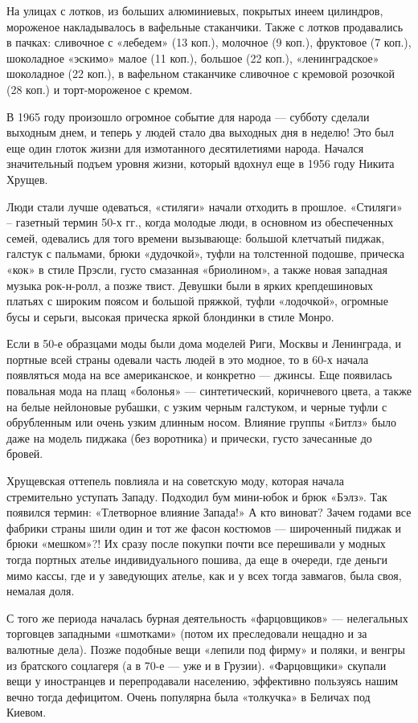 На улицах с лотков, из больших алюминиевых, покрытых инеем цилиндров, мороженое
накладывалось в вафельные стаканчики. Также с лотков продавались в пачках:
сливочное с «лебедем» (13 коп.), молочное (9 коп.), фруктовое (7 коп.),
шоколадное «эскимо» малое (11 коп.), большое (22 коп.), «ленинградское»
шоколадное (22 коп.), в вафельном стаканчике сливочное с кремовой розочкой (28
коп.) и торт-мороженое с кремом. 

В 1965 году произошло огромное событие для народа --- субботу сделали выходным
днем, и теперь у людей стало два выходных дня в неделю! Это был еще один глоток
жизни для измотанного десятилетиями народа. Начался значительный подъем уровня
жизни, который вдохнул еще в 1956 году Никита Хрущев.

Люди стали лучше одеваться, «стиляги» начали отходить в прошлое. «Стиляги» –
газетный термин 50-х гг., когда молодые люди, в основном из обеспеченных семей,
одевались для того времени вызывающе: большой клетчатый пиджак, галстук с
пальмами, брюки «дудочкой», туфли на толстенной подошве, прическа «кок» в стиле
Прэсли, густо смазанная «бриолином», а также новая западная музыка рок-н-ролл,
а позже твист. Девушки были в ярких крепдешиновых платьях с широким поясом и
большой пряжкой, туфли «лодочкой», огромные бусы и серьги, высокая прическа
яркой блондинки в стиле Монро.

Если в 50-е образцами моды были дома моделей Риги, Москвы и Ленинграда, и
портные всей страны одевали часть людей в это модное, то в 60-х начала
появляться мода на все американское, и конкретно --- джинсы. Еще появилась
повальная мода на плащ «болонья» --- синтетический, коричневого цвета, а также на
белые нейлоновые рубашки, с узким черным галстуком, и черные туфли с
обрубленным или очень узким длинным носом. Влияние группы «Битлз» было даже на
модель пиджака (без воротника) и прически, густо зачесанные до бровей.

Хрущевская оттепель повлияла и на советскую моду, которая начала стремительно
уступать Западу. Подходил бум мини-юбок и брюк «Бэлз». Так появился термин:
«Тлетворное влияние Запада!» А кто виноват? Зачем годами все фабрики страны
шили один и тот же фасон костюмов --- широченный пиджак и брюки «мешком»?! Их
сразу после покупки почти все перешивали у модных тогда портных ателье
индивидуального пошива, да еще в очереди, где деньги мимо кассы, где и у
заведующих ателье, как и у всех тогда завмагов, была своя, немалая доля.

С того же периода началась бурная деятельность «фарцовщиков» --- нелегальных
торговцев западными «шмотками» (потом их преследовали нещадно и за валютные
дела). Позже подобные вещи «лепили под фирму» и поляки, и венгры из братского
соцлагеря (а в 70-е --- уже и в Грузии). «Фарцовщики» скупали вещи у иностранцев
и перепродавали населению, эффективно пользуясь нашим вечно тогда дефицитом.
Очень популярна была «толкучка» в Беличах под Киевом.

